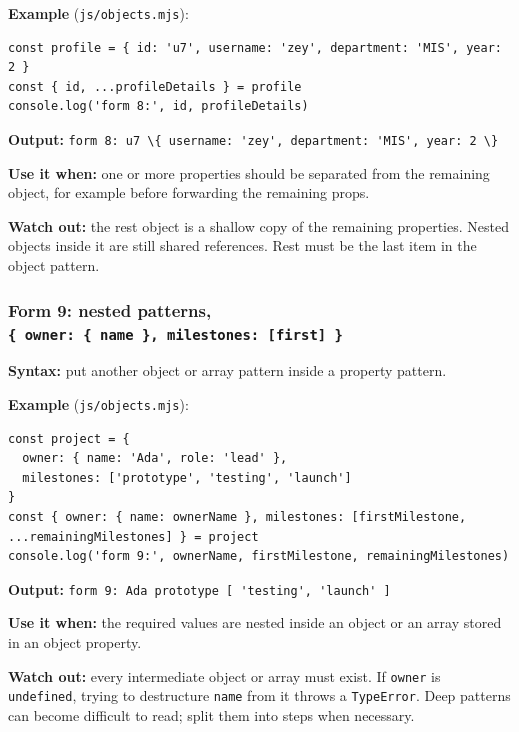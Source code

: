 \documentclass[
]{article}
\newcommand{\passthrough}[1]{#1}
\begin{document}
\textbf{Example} (\passthrough{\lstinline!js/objects.mjs!}):

\begin{lstlisting}
const profile = { id: 'u7', username: 'zey', department: 'MIS', year: 2 }
const { id, ...profileDetails } = profile
console.log('form 8:', id, profileDetails)
\end{lstlisting}

\textbf{Output:}
\passthrough{\lstinline!form 8: u7 \{ username: 'zey', department: 'MIS', year: 2 \}!}

\textbf{Use it when:} one or more properties should be separated from
the remaining object, for example before forwarding the remaining props.

\textbf{Watch out:} the rest object is a shallow copy of the remaining
properties. Nested objects inside it are still shared references. Rest
must be the last item in the object pattern.

\subsubsection{\texorpdfstring{Form 9: nested patterns,
\texttt{\{\ owner:\ \{\ name\ \},\ milestones:\ {[}first{]}\ \}}}{Form 9: nested patterns, \{ owner: \{ name \}, milestones: {[}first{]} \}}}\label{form-9-nested-patterns--owner--name--milestones-first-}

\textbf{Syntax:} put another object or array pattern inside a property
pattern.

\textbf{Example} (\passthrough{\lstinline!js/objects.mjs!}):

\begin{lstlisting}
const project = {
  owner: { name: 'Ada', role: 'lead' },
  milestones: ['prototype', 'testing', 'launch']
}
const { owner: { name: ownerName }, milestones: [firstMilestone, ...remainingMilestones] } = project
console.log('form 9:', ownerName, firstMilestone, remainingMilestones)
\end{lstlisting}

\textbf{Output:}
\passthrough{\lstinline!form 9: Ada prototype [ 'testing', 'launch' ]!}

\textbf{Use it when:} the required values are nested inside an object or
an array stored in an object property.

\textbf{Watch out:} every intermediate object or array must exist. If
\passthrough{\lstinline!owner!} is \passthrough{\lstinline!undefined!},
trying to destructure \passthrough{\lstinline!name!} from it throws a
\passthrough{\lstinline!TypeError!}. Deep patterns can become difficult
to read; split them into steps when necessary.
\end{document}
